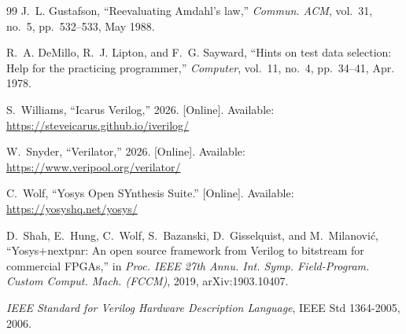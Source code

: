\documentclass[journal]{IEEEtran}
\begin{document}
\begin{thebibliography}{99}
 J.~L. Gustafson, ``Reevaluating Amdahl's law,'' \emph{Commun.
ACM}, vol.~31, no.~5, pp.~532--533, May 1988.

 R.~A. DeMillo, R.~J. Lipton, and F.~G. Sayward, ``Hints on test data
selection: Help for the practicing programmer,'' \emph{Computer}, vol.~11, no.~4,
pp.~34--41, Apr. 1978.

 S.~Williams, ``Icarus Verilog,'' 2026. [Online]. Available:
\url{https://steveicarus.github.io/iverilog/}

 W.~Snyder, ``Verilator,'' 2026. [Online]. Available:
\url{https://www.veripool.org/verilator/}

 C.~Wolf, ``Yosys Open SYnthesis Suite.'' [Online]. Available:
\url{https://yosyshq.net/yosys/}

 D.~Shah, E.~Hung, C.~Wolf, S.~Bazanski, D.~Gisselquist, and
M.~Milanovi\'c, ``Yosys+nextpnr: An open source framework from Verilog to bitstream
for commercial FPGAs,'' in \emph{Proc. IEEE 27th Annu. Int. Symp.
Field-Program. Custom Comput. Mach. (FCCM)}, 2019, arXiv:1903.10407.

 \emph{IEEE Standard for Verilog Hardware Description Language},
IEEE Std 1364-2005, 2006.

\end{thebibliography}
\end{document}
